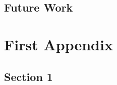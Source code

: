   \section{Future Work}\label{sec:futureWork}
    \lipsum[38]\cite{TEST}
	
  \printreferences 


\bigskip 
\clearpage

 \singlespacing                %
 
\printbibliography[heading=bibintoc]
\bigskip

\appendix
 \truedoublespacing            %

\chapter{First Appendix}\label{app:firstAppendix}
  \section{Section 1}\label{sec:A1section1}
    \lipsum[34-36]
